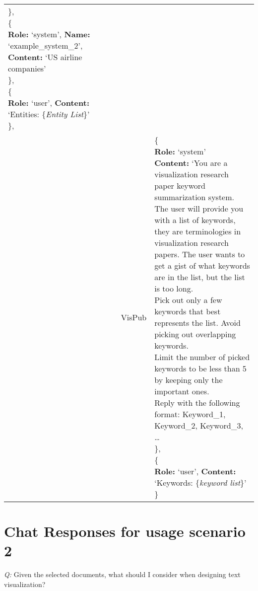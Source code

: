 \begin{center}
\begin{tabular}{ | p{3.0cm} | p{3.0cm} | p{13cm} | }
{    \}, \\
    \{\\
    \quad\textbf{Role:} `system', \textbf{Name:} `example\_system\_2', \textbf{Content:} `US airline companies'\\
    \},\\
    \{\\
    \quad\textbf{Role:} `user', \textbf{Content:} `Entities: \{\textit{Entity List}\}'\\
    \},\\
    } \\
    \cline{2-3}
     & VisPub & \makecell[tl]{
    \{\\
    \quad\textbf{Role:} `system'\\
    \quad\textbf{Content:} `You are a visualization research paper keyword summarization system.\\
    \quad The user will provide you with a list of keywords, they are terminologies in visualization research\\
    \quad papers. The user wants to get a gist of what keywords are in the list, but the list is too long.\\
    \quad Pick out only a few keywords that best represents the list. Avoid picking out overlapping keywords. \\
    \quad Limit the number of picked keywords to be less than 5 by keeping only the important ones. \\
    \quad Reply with the following format: Keyword\_1, Keyword\_2, Keyword\_3, \dots \\
    \},\\
    \{\\
    \quad\textbf{Role: } `user', \textbf{Content:} `Keywords: \{\textit{keyword list}\}' \\
    \}\\
    }\\
    \hline
\end{tabular}
\end{center}
\clearpage
\section{Chat Responses for usage scenario 2}
\quad \textit{Q: } Given the selected documents, what should I consider when designing text visualization?

